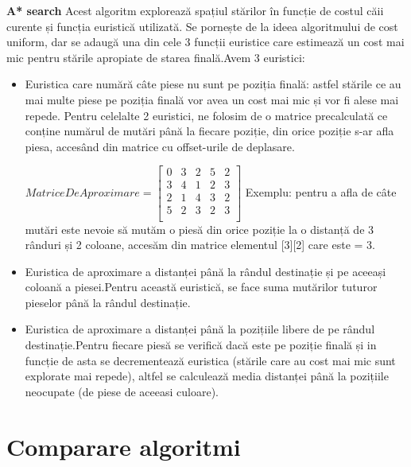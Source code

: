 \documentclass{article}
\begin{document}
     \textbf{A* search}\hfill \break
        Acest algoritm explorează spațiul stărilor în funcție de costul căii curente și funcția euristică utilizată. Se pornește de la ideea algoritmului de cost uniform, dar se adaugă una din cele 3 funcții euristice care estimează un cost mai mic pentru stările apropiate de starea finală.\hfill \break Avem 3 euristici:
        \begin{itemize}
        
        \item Euristica care numără câte piese nu sunt pe poziția finală: astfel stările ce au mai multe piese pe poziția finală vor avea un cost mai mic și vor fi alese mai repede.\hfill \break
        Pentru celelalte 2 euristici, ne folosim de o matrice precalculată ce conține numărul de mutări până la fiecare poziție, din orice poziție s-ar afla piesa, accesând din matrice cu offset-urile de deplasare.\hfill \break
        
    $MatriceDeAproximare=\begin{bmatrix} 
    0 & 3 & 2 & 5 & 2\\
    3 & 4 & 1 & 2 & 3\\
    2 & 1 & 4 & 3 & 2\\
    5 & 2 & 3 & 2 & 3\\
    \end{bmatrix}$\hfill \break
        Exemplu: pentru a afla de câte mutări este nevoie să mutăm o piesă din orice poziție la o distanță de 3 rânduri și 2 coloane, accesăm din matrice elementul [3][2] care este = 3.
        
        \item
        Euristica de aproximare a distanței până la rândul destinație și pe aceeași coloană a piesei.Pentru această euristică, se face suma mutărilor tuturor pieselor până la rândul destinație.
        \item Euristica de aproximare a distanței până la pozițiile libere de pe rândul destinație.Pentru fiecare piesă se verifică dacă este pe poziție finală și in funcție de asta se decrementează euristica (stările care au cost mai mic sunt explorate mai repede), altfel se calculează media distanței până la pozițiile neocupate (de piese de aceeasi culoare). 
        
        \end{itemize}
        
\section{Comparare algoritmi}
\end{document}
